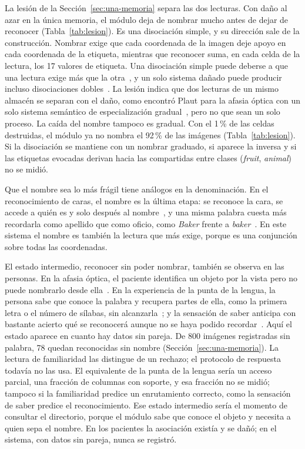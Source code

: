 La lesión de la Sección~\ref{sec:una-memoria} separa las dos lecturas.
Con daño al azar en la única memoria, el módulo deja de nombrar mucho antes de dejar de
reconocer (Tabla~\ref{tab:lesion}).
Es una disociación simple, y su dirección sale de la construcción.
Nombrar exige que cada coordenada de la imagen deje apoyo en cada coordenada de la
etiqueta, mientras que reconocer suma, en cada celda de la lectura, los 17 valores de
etiqueta.
Una disociación simple puede deberse a que una lectura exige más que la
otra~\cite{shallice1988neuropsychology}, y un solo sistema dañado puede producir incluso
disociaciones dobles~\cite{plaut1995double}.
La lesión indica que dos lecturas de un mismo almacén se separan con el daño, como
encontró Plaut para la afasia óptica con un solo sistema semántico de especialización
gradual~\cite{plaut2002graded}, pero no que sean un solo proceso.
La caída del nombre tampoco es gradual.
Con el 1\,\% de las celdas destruidas, el módulo ya no nombra el 92\,\% de las imágenes
(Tabla~\ref{tab:lesion}).
Si la disociación se mantiene con un nombrar graduado, si aparece la inversa y si las
etiquetas evocadas derivan hacia las compartidas entre clases (\textit{fruit},
\textit{animal}) no se midió.

Que el nombre sea lo más frágil tiene análogos en la denominación.
En el reconocimiento de caras, el nombre es la última etapa: se reconoce la cara, se
accede a quién es y solo después al nombre~\cite{bruce1986understanding}, y una misma
palabra cuesta más recordarla como apellido que como oficio, como \textit{Baker} frente
a \textit{baker}~\cite{mcweeny1987putting}.
En este sistema el nombre es también la lectura que más exige, porque es una conjunción
sobre todas las coordenadas.

El estado intermedio, reconocer sin poder nombrar, también se observa en las personas.
En la afasia óptica, el paciente identifica un objeto por la vista pero no puede
nombrarlo desde ella~\cite{beauvois1982optic}.
En la experiencia de la punta de la lengua, la persona sabe que conoce la palabra y
recupera partes de ella, como la primera letra o el número de sílabas, sin
alcanzarla~\cite{brown1966tip}; y la sensación de saber anticipa con bastante acierto qué
se reconocerá aunque no se haya podido recordar~\cite{hart1965memory}.
Aquí el estado aparece en cuanto hay datos sin pareja.
De 800 imágenes registradas sin palabra, 78 quedan reconocidas sin nombre
(Sección~\ref{sec:una-memoria}).
La lectura de familiaridad las distingue de un rechazo; el protocolo de respuesta
todavía no las usa.
El equivalente de la punta de la lengua sería un acceso parcial, una fracción de
columnas con soporte, y esa fracción no se midió; tampoco si la familiaridad predice un
enrutamiento correcto, como la sensación de saber predice el reconocimiento.
Ese estado intermedio sería el momento de consultar el directorio, porque el módulo sabe que
conoce el objeto y necesita a quien sepa el nombre.
En los pacientes la asociación existía y se dañó; en el sistema, con datos sin pareja,
nunca se registró.

